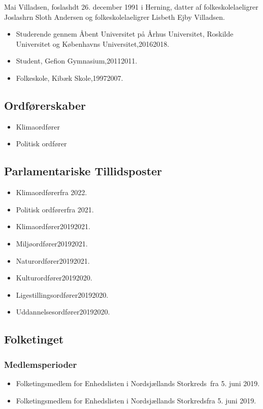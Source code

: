 \documentclass[11pt, a4paper]{awesome-cv}
\begin{document}
\makecvheader[R]
\makelettertitle
\begin{cvletter}
Mai Villadsen, foslashdt 26. december 1991 i Herning, datter af folkeskolelaeligrer Joslashrn Sloth Andersen og folkeskolelaeligrer Lisbeth Ejby Villadsen.

\begin{itemize}
\item Studerende gennem Åbent Universitet på Århus Universitet, Roskilde Universitet og Københavns Universitet,20162018.
\item Student, Gefion Gymnasium,20112011.
\item Folkeskole, Kibæk Skole,19972007.
\end{itemize}
\subsection*{Ordførerskaber}
\begin{itemize}
\item Klimaordfører
\item Politisk ordfører
\end{itemize}
\subsection*{Parlamentariske Tillidsposter}
\begin{itemize}
\item Klimaordførerfra 2022.
\item Politisk ordførerfra 2021.
\item Klimaordfører20192021.
\item Miljøordfører20192021.
\item Naturordfører20192021.
\item Kulturordfører20192020.
\item Ligestillingsordfører20192020.
\item Uddannelsesordfører20192020.
\end{itemize}
\subsection*{Folketinget}
\subsubsection*{Medlemsperioder}
\begin{itemize}
\item Folketingsmedlem for Enhedslisten i Nordsjællands Storkreds fra 5. juni 2019.
\item Folketingsmedlem for Enhedslisten i Nordsjællands Storkredsfra 5. juni 2019.
\end{itemize}

\end{cvletter}
\end{document}
